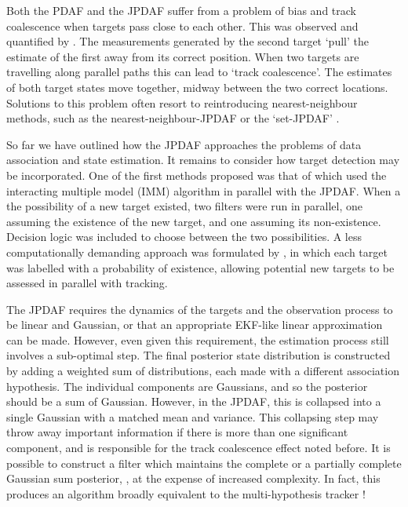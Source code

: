 Both the PDAF and the JPDAF suffer from a problem of bias and track coalescence when targets pass close to each other. This was observed and quantified by \cite{Fitzgerald1985}. The measurements generated by the second target `pull' the estimate of the first away from its correct position. When two targets are travelling along parallel paths this can lead to `track coalescence'. The estimates of both target states move together, midway between the two correct locations. Solutions to this problem often resort to reintroducing nearest-neighbour methods, such as the nearest-neighbour-JPDAF \cite{Fitzgerald1986} or the `set-JPDAF' \cite{Svensson2009a}.

So far we have outlined how the JPDAF approaches the problems of data association and state estimation. It remains to consider how target detection may be incorporated. One of the first methods proposed was that of \cite{Bar-Shalom1989} which used the interacting multiple model (IMM) algorithm in parallel with the JPDAF. When a the possibility of a new target existed, two filters were run in parallel, one assuming the existence of the new target, and one assuming its non-existence. Decision logic was included to choose between the two possibilities. A less computationally demanding approach was formulated by \cite{Musicki1994,Musicki2004}, in which each target was labelled with a probability of existence, allowing potential new targets to be assessed in parallel with tracking.

The JPDAF requires the dynamics of the targets and the observation process to be linear and Gaussian, or that an appropriate EKF-like linear approximation can be made. However, even given this requirement, the estimation process still involves a sub-optimal step. The final posterior state distribution is constructed by adding a weighted sum of distributions, each made with a different association hypothesis. The individual components are Gaussians, and so the posterior should be a sum of Gaussian. However, in the JPDAF, this is collapsed into a single Gaussian with a matched mean and variance. This collapsing step may throw away important information if there is more than one significant component, and is responsible for the track coalescence effect noted before. It is possible to construct a filter which maintains the complete or a partially complete Gaussian sum posterior, \cite{Singer1974,Salmond1990}, at the expense of increased complexity. In fact, this produces an algorithm broadly equivalent to the multi-hypothesis tracker \cite{Blackman2004}!

